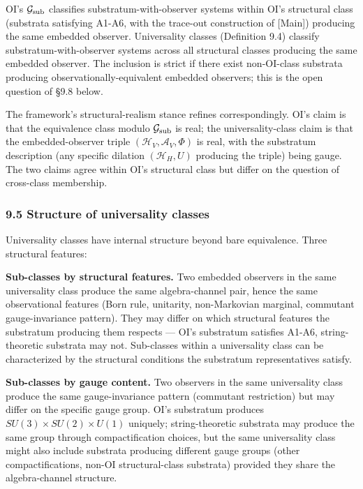 \documentclass[
]{article}
\begin{document}
OI's \(\mathcal{G}_{\rm sub}\) classifies substratum-with-observer
systems within OI's structural class (substrata satisfying A1-A6, with
the trace-out construction of {[}Main{]}) producing the same embedded
observer. Universality classes (Definition 9.4) classify
substratum-with-observer systems across all structural classes producing
the same embedded observer. The inclusion is strict if there exist
non-OI-class substrata producing observationally-equivalent embedded
observers; this is the open question of §9.8 below.

The framework's structural-realism stance refines correspondingly. OI's
claim is that the equivalence class modulo \(\mathcal{G}_{\rm sub}\) is
real; the universality-class claim is that the embedded-observer triple
\((\mathcal{H}_V, \mathcal{A}_V, \Phi)\) is real, with the substratum
description (any specific dilation \((\mathcal{H}_H, U)\) producing the
triple) being gauge. The two claims agree within OI's structural class
but differ on the question of cross-class membership.

\hypertarget{structure-of-universality-classes}{%
\subsubsection{9.5 Structure of universality
classes}\label{structure-of-universality-classes}}

Universality classes have internal structure beyond bare equivalence.
Three structural features:

\textbf{Sub-classes by structural features.} Two embedded observers in
the same universality class produce the same algebra-channel pair, hence
the same observational features (Born rule, unitarity, non-Markovian
marginal, commutant gauge-invariance pattern). They may differ on which
structural features the substratum producing them respects --- OI's
substratum satisfies A1-A6, string-theoretic substrata may not.
Sub-classes within a universality class can be characterized by the
structural conditions the substratum representatives satisfy.

\textbf{Sub-classes by gauge content.} Two observers in the same
universality class produce the same gauge-invariance pattern (commutant
restriction) but may differ on the specific gauge group. OI's substratum
produces \(SU(3) \times SU(2) \times U(1)\) uniquely; string-theoretic
substrata may produce the same group through compactification choices,
but the same universality class might also include substrata producing
different gauge groups (other compactifications, non-OI structural-class
substrata) provided they share the algebra-channel structure.
\end{document}
